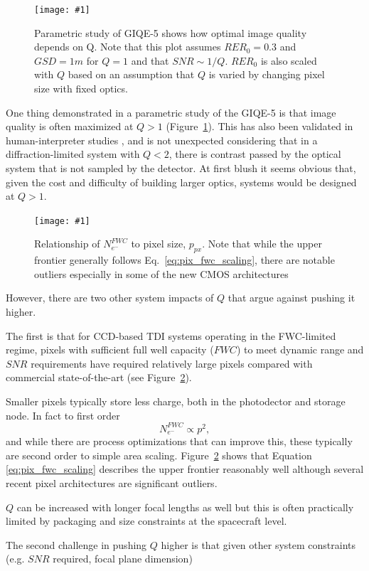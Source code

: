 \documentclass[]{spieman}  %
\newcommand{\includefigure}[3]
{
  \begin{figure}[h!tb]
  \centering
  \texttt{[image: \#1]}
  \caption[]{#3}
  \label{#2}
  \end{figure}
}
\begin{document}
\includefigure{figures/Q_iq.pgf}{fig:q_iq}{Parametric study of GIQE-5 shows how optimal image quality depends on Q.  Note that this plot assumes $RER_0 = 0.3$ and $GSD = 1m$ for $Q=1$ and that $SNR \sim 1 / Q$.  $RER_0$ is also scaled with $Q$ based on an assumption that $Q$ is varied by changing pixel size with fixed optics.}

One thing demonstrated in a parametric study of the GIQE-5 is that image quality is often maximized at $Q>1$ (Figure~\ref{fig:q_iq}).  This has also been validated in human-interpreter studies \cite{fiete_Q_IQ}, \cite{auelmann_iq} and is not unexpected considering that in a diffraction-limited system with $Q<2$, there is contrast passed by the optical system that is not sampled by the detector.  At first blush it seems obvious that, given the cost and difficulty of building larger optics, systems would be designed at $Q>1$.  

\includefigure{figures/p_fwc.pgf}{fig:p_fwc}{Relationship of $N_{e^-}^{FWC}$ to pixel size, $p_{px}$.  Note that while the upper frontier generally follows Eq.~\eqref{eq:pix_fwc_scaling}, there are notable outliers especially in some of the new CMOS architectures}

However, there are two other system impacts of $Q$ that argue against pushing it higher.

The first is that for CCD-based TDI systems operating in the FWC-limited regime, pixels with sufficient full well capacity ($FWC$) to meet dynamic range and $SNR$ requirements have required relatively large pixels compared with commercial state-of-the-art (see Figure~\ref{fig:p_fwc}).

Smaller pixels typically store less charge, both in the photodector and storage node. In fact to first order~\cite{jerram}
\begin{equation}
  \label{eq:pix_fwc_scaling}  
N_{e^-}^{FWC} \propto p^2,
\end{equation}
and while there are process optimizations that can improve this, these typically are second order to simple area scaling.  Figure~\ref{fig:p_fwc} shows that Equation \eqref{eq:pix_fwc_scaling} describes the upper frontier reasonably well although several recent pixel architectures are significant outliers.

$Q$ can be increased with longer focal lengths as well but this is often practically limited by packaging and size constraints at the spacecraft level.

The second challenge in pushing $Q$ higher is that given other system constraints (e.g. $SNR$ required, focal plane dimension)
\end{document}
